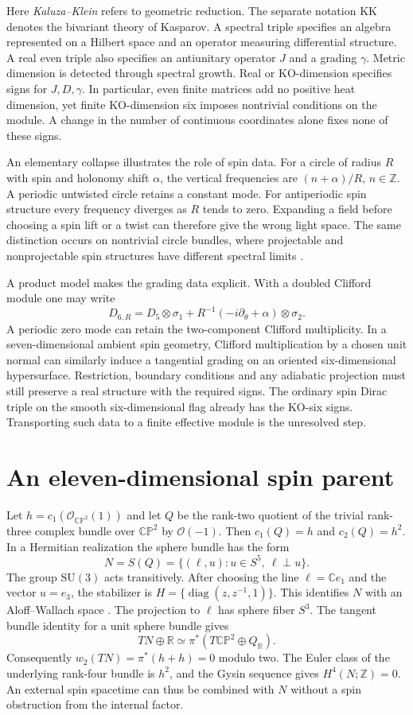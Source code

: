 \documentclass[11pt,oneside]{article}
\newcommand{\C}{\mathbb C}
\newcommand{\R}{\mathbb R}
\newcommand{\Z}{\mathbb Z}
\newcommand{\CP}{\mathbb{CP}}
\newcommand{\SU}{\mathrm{SU}}
\newcommand{\KK}{\mathrm{KK}}
\newcommand{\OO}{\mathcal O}
\begin{document}
Here \emph{Kaluza--Klein} refers to geometric reduction. The separate notation \(\KK\) denotes the bivariant theory of Kasparov. A spectral triple specifies an algebra represented on a Hilbert space and an operator measuring differential structure. A real even triple also specifies an antiunitary operator \(J\) and a grading \(\gamma\). Metric dimension is detected through spectral growth. Real or KO-dimension specifies signs for \(J,D,\gamma\). In particular, even finite matrices add no positive heat dimension, yet finite KO-dimension six imposes nontrivial conditions on the module. A change in the number of continuous coordinates alone fixes none of these signs.

An elementary collapse illustrates the role of spin data. For a circle of radius \(R\) with spin and holonomy shift \(\alpha\), the vertical frequencies are \((n+\alpha)/R\), \(n\in\Z\). A periodic untwisted circle retains a constant mode. For antiperiodic spin structure every frequency diverges as \(R\) tends to zero. Expanding a field before choosing a spin lift or a twist can therefore give the wrong light space. The same distinction occurs on nontrivial circle bundles, where projectable and nonprojectable spin structures have different spectral limits \cite{ammann}.

A product model makes the grading data explicit. With a doubled Clifford module one may write
\[
 D_{6,R}=D_5\otimes\sigma_1+
 R^{-1}(-i\partial_\theta+\alpha)\otimes\sigma_2 .
\]
A periodic zero mode can retain the two-component Clifford multiplicity. In a seven-dimensional ambient spin geometry, Clifford multiplication by a chosen unit normal can similarly induce a tangential grading on an oriented six-dimensional hypersurface. Restriction, boundary conditions and any adiabatic projection must still preserve a real structure with the required signs. The ordinary spin Dirac triple on the smooth six-dimensional flag already has the KO-six signs. Transporting such data to a finite effective module is the unresolved step.

\section{An eleven-dimensional spin parent}
Let \(h=c_1(\OO_{\CP^2}(1))\) and let \(Q\) be the rank-two quotient of the trivial rank-three complex bundle over \(\CP^2\) by \(\OO(-1)\). Then \(c_1(Q)=h\) and \(c_2(Q)=h^2\). In a Hermitian realization the sphere bundle has the form
\[
 N=S(Q)=\{(\ell,u): u\in S^5,\ \ell\perp u\}.
\]
The group \(\SU(3)\) acts transitively. After choosing the line \(\ell=\C e_1\) and the vector \(u=e_3\), the stabilizer is \(H=\{\operatorname{diag}(z,z^{-1},1)\}\). This identifies \(N\) with an Aloff--Wallach space \cite{lehmann}. The projection to \(\ell\) has sphere fiber \(S^3\). The tangent bundle identity for a unit sphere bundle gives
\[
 TN\oplus\R\simeq\pi^*(T\CP^2\oplus Q_{\R}).
\]
Consequently \(w_2(TN)=\pi^*(h+h)=0\) modulo two. The Euler class of the underlying rank-four bundle is \(h^2\), and the Gysin sequence gives \(H^4(N;\Z)=0\). An external spin spacetime can thus be combined with \(N\) without a spin obstruction from the internal factor.
\end{document}
